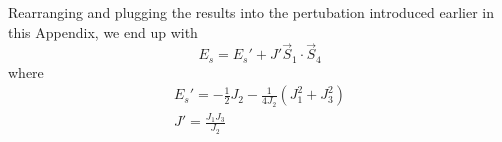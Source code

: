 \documentclass[../main.tex]{subfiles}
\begin{document}
Rearranging and plugging the results into the pertubation introduced earlier in this Appendix, we end up with
\begin{equation}
E_{s}=E_{s}'+J'\vec{S}_{1}\cdot\vec{S}_{4}
\end{equation}
where
\begin{equation}
\begin{gathered}
    E_{s}'=-\frac{1}{2}J_{2}-\frac{1}{4J_{2}}(J_{1}^{2}+J_{3}^{2})\\
    J'=\frac{J_{1}J_{3}}{J_{2}}
\end{gathered}
\end{equation}
\end{document}
